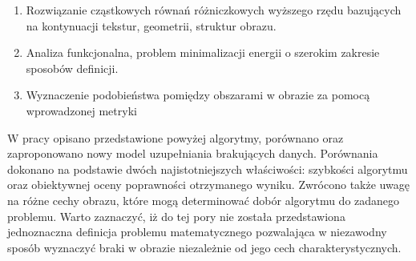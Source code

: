 \documentclass[12pt, twoside, openany]{report}
\theoremstyle{definition}
\begin{document}
\begin{enumerate}
\item
Rozwiązanie cząstkowych równań różniczkowych wyższego rzędu bazujących na kontynuacji tekstur, geometrii, struktur obrazu.
\item
Analiza funkcjonalna, problem minimalizacji energii o szerokim zakresie sposobów definicji.
\item
Wyznaczenie podobieństwa pomiędzy obszarami w obrazie za pomocą wprowadzonej metryki 
\end{enumerate}
W pracy opisano przedstawione powyżej algorytmy, porównano oraz zaproponowano nowy model uzupełniania brakujących danych. Porównania dokonano na podstawie dwóch najistotniejszych właściwości: szybkości algorytmu oraz obiektywnej oceny poprawności otrzymanego wyniku. Zwrócono także uwagę na różne cechy obrazu, które mogą determinować dobór algorytmu do zadanego problemu. Warto zaznaczyć, iż do tej pory nie została przedstawiona jednoznaczna definicja problemu matematycznego pozwalająca w niezawodny sposób wyznaczyć braki w obrazie niezależnie od jego cech charakterystycznych.
\end{document}
